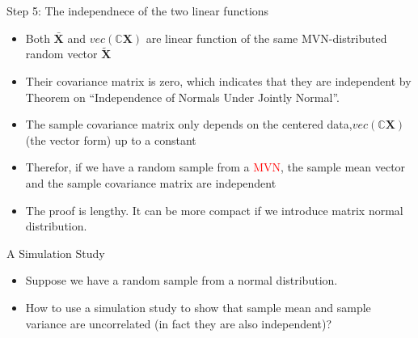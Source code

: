 \documentclass[
  ignorenonframetext,
]{beamer}
\providecommand{\tightlist}{%
  \setlength{\itemsep}{0pt}\setlength{\parskip}{0pt}}
\begin{document}
\begin{frame}{Step 5: The independnece of the two linear functions}
\protect\hypertarget{step-5-the-independnece-of-the-two-linear-functions}{}
\begin{itemize}
\tightlist
\item
  Both \(\bar{\mathbf X}\) and \(vec(\mathbb C\mathbf X)\) are linear
  function of the same MVN-distributed random vector
  \(\tilde {\mathbf X}\)
\item
  Their covariance matrix is zero, which indicates that they are
  independent by Theorem on ``Independence of Normals Under Jointly
  Normal''.
\item
  The sample covariance matrix only depends on the centered
  data,\(vec(\mathbb C\mathbf X)\) (the vector form) up to a constant
\item
  Therefor, if we have a random sample from a \textcolor{red}{MVN}, the
  sample mean vector and the sample covariance matrix are independent
\item
  The proof is lengthy. It can be more compact if we introduce matrix
  normal distribution.
\end{itemize}
\end{frame}

\begin{frame}{A Simulation Study}
\protect\hypertarget{a-simulation-study}{}
\begin{itemize}
\tightlist
\item
  Suppose we have a random sample from a normal distribution.
\item
  How to use a simulation study to show that sample mean and sample
  variance are uncorrelated (in fact they are also independent)?
\end{itemize}
\end{frame}
\end{document}
